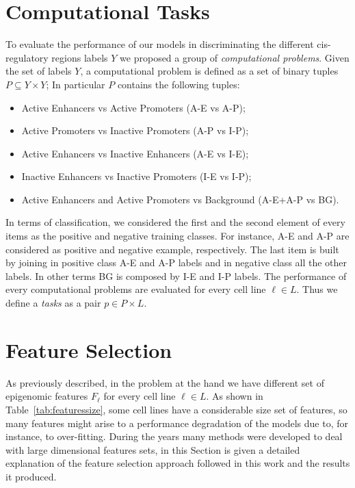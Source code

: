 \section{Computational Tasks} \label{sec:computational_tasks}
To evaluate the performance of our models in discriminating the different cis-regulatory regions labels $Y$ we proposed a group of \emph{computational problems}. Given the set of labels $Y$, a computational problem is defined as a set of binary tuples $P \subseteq Y \times Y$; In particular $P$ contains the following tuples: 
\begin{itemize}
    \item Active Enhancers vs Active Promoters (A-E vs A-P);
    \item Active Promoters vs Inactive Promoters (A-P vs I-P);
    \item Active Enhancers vs Inactive Enhancers (A-E vs I-E); 
    \item Inactive Enhancers vs Inactive Promoters (I-E vs I-P); 
    \item Active Enhancers and Active Promoters vs Background (A-E+A-P vs BG).
\end{itemize}
In terms of classification, we considered the first and the second element of every items as the positive and negative training classes. For instance, A-E and A-P are considered as positive and negative example, respectively. The last item is built by joining in positive class A-E and A-P labels and in negative class all the other labels. In other terms BG is composed by I-E and I-P labels. The performance of every computational problems are evaluated for every cell line $\ell \in L$. Thus we define a \emph{tasks} as a pair $p \in P \times L$. 

\section{Feature Selection} \label{sec:featureselection}
As previously described, in the problem at the hand we have different set of epigenomic features $F_\ell$ for every cell line $\ell \in L$. As shown in Table~\ref{tab:featuressize}, some cell lines have a considerable size set of features, so many features might arise to a performance degradation of the models due to, for instance, to over-fitting. During the years many methods were developed to deal with large dimensional features sets, in this Section is given a detailed explanation of the feature selection approach followed in this work and the results it produced. 

